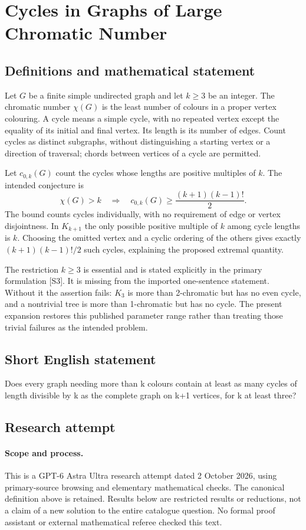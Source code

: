 \documentclass[11pt,a4paper]{article}
\begin{document}
\section*{Cycles in Graphs of Large Chromatic Number}\label{statement}

\subsection{Definitions and mathematical statement}
Let $G$ be a finite simple undirected graph and let $k\ge3$ be an integer.
The chromatic number $\chi(G)$ is the least number of colours in a proper
vertex colouring. A cycle means a simple cycle, with no repeated vertex
except the equality of its initial and final vertex. Its length is its
number of edges. Count cycles as distinct subgraphs, without distinguishing
a starting vertex or a direction of traversal; chords between vertices
of a cycle are permitted.

Let $c_{0,k}(G)$ count the cycles whose lengths are positive multiples of
$k$. The intended conjecture is
\[
 \chi(G)>k\quad\Longrightarrow\quad
 c_{0,k}(G)\ge\frac{(k+1)(k-1)!}{2}.
\]
The bound counts cycles individually, with no requirement of edge or
vertex disjointness. In $K_{k+1}$ the only possible positive multiple of
$k$ among cycle lengths is $k$. Choosing the omitted vertex and a cyclic
ordering of the others gives exactly $(k+1)(k-1)!/2$ such cycles, explaining
the proposed extremal quantity.

The restriction $k\ge3$ is essential and is stated explicitly in the
primary formulation [S3]. It is missing from the imported one-sentence
statement. Without it the assertion fails: $K_3$ is more than
2-chromatic but has no even cycle, and a nontrivial tree is more than
1-chromatic but has no cycle. The present expansion restores this
published parameter range rather than treating those trivial failures
as the intended problem.
\subsection{Short English statement}
Does every graph needing more than k colours contain at least as many cycles of length divisible by k as the complete graph on k+1 vertices, for k at least three?
\subsection{Research attempt}
\paragraph{Scope and process.}
This is a GPT-6 Astra Ultra research attempt dated 2 October 2026, using
primary-source browsing and elementary mathematical checks. The canonical
definition above is retained. Results below are restricted results or
reductions, not a claim of a new solution to the entire catalogue question.
No formal proof assistant or external mathematical referee checked this text.
\end{document}
